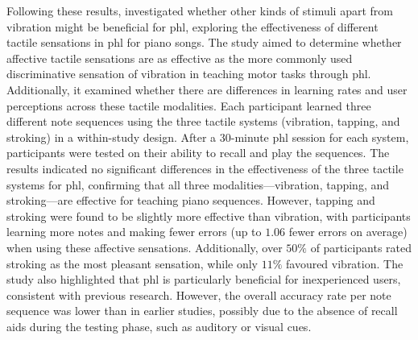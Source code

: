 Following these results, \cite{Fang2023} investigated whether other kinds of stimuli apart from vibration might be beneficial for \gls{phl}, exploring the effectiveness of different tactile sensations in \gls{phl} for piano songs. The study aimed to determine whether affective tactile sensations are as effective as the more commonly used discriminative sensation of vibration in teaching motor tasks through \gls{phl}. Additionally, it examined whether there are differences in learning rates and user perceptions across these tactile modalities. Each participant learned three different note sequences using the three tactile systems (vibration, tapping, and stroking) in a within-study design. After a 30-minute \gls{phl} session for each system, participants were tested on their ability to recall and play the sequences. The results indicated no significant differences in the effectiveness of the three tactile systems for \gls{phl}, confirming that all three modalities—vibration, tapping, and stroking—are effective for teaching piano sequences. However, tapping and stroking were found to be slightly more effective than vibration, with participants learning more notes and making fewer errors (up to $1.06$ fewer errors on average) when using these affective sensations. Additionally, over $50\%$ of participants rated stroking as the most pleasant sensation, while only $11\%$ favoured vibration. The study also highlighted that \gls{phl} is particularly beneficial for inexperienced users, consistent with previous research. However, the overall accuracy rate per note sequence was lower than in earlier studies, possibly due to the absence of recall aids during the testing phase, such as auditory or visual cues.



